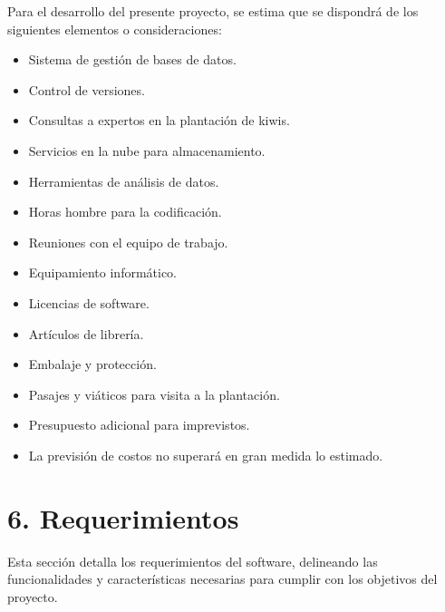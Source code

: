 \documentclass[
11pt, %
]{charter}
\begin{document}
Para el desarrollo del presente proyecto, se estima que se dispondrá de los siguientes elementos o consideraciones:

\begin{itemize}
    \item Sistema de gestión de bases de datos.
    \item Control de versiones.
    \item Consultas a expertos en la plantación de kiwis.
    \item Servicios en la nube para almacenamiento.
    \item Herramientas de análisis de datos.
    \item Horas hombre para la codificación.
    \item Reuniones con el equipo de trabajo.
    \item Equipamiento informático.
    \item Licencias de software.
    \item Artículos de librería.
    \item Embalaje y protección.
    \item Pasajes y viáticos para visita a la plantación.
    \item Presupuesto adicional para imprevistos.
    \item La previsión de costos no superará en gran medida lo estimado.
\end{itemize}


\section{6. Requerimientos}
\label{sec:requerimientos}
Esta sección detalla los requerimientos del software, delineando las funcionalidades y características necesarias para cumplir con los objetivos del proyecto.
\end{document}
